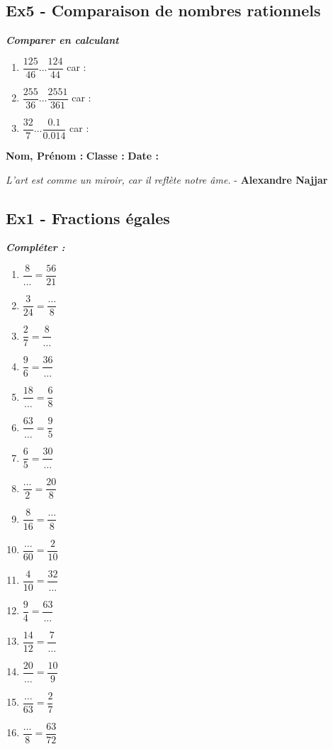 \documentclass[11pt]{article}
\begin{document}
\subsection*{Ex5 - Comparaison de nombres rationnels}

\textit{\textbf{Comparer en calculant}}

\begin{enumerate}
\item $ \dfrac{125}{46} \ldots \dfrac{124}{44} $  car : \dotfill
\item $ \dfrac{255}{36} \ldots \dfrac{2551}{361} $  car : \dotfill
\item $ \dfrac{32}{7} \ldots \dfrac{0.1}{0.014} $  car : \dotfill

\end{enumerate}

\newpage

\textbf{Nom, Prénom :} \hspace{8cm} \textbf{Classe :} \hspace{3cm} \textbf{Date :}\\

\begin{center}
  \textit{L'art est comme un miroir, car il reflète notre âme.}  - \textbf{Alexandre Najjar}
\end{center}


\subsection*{Ex1 - Fractions égales}

\textit{\textbf{Compléter :}}

\begin{multicols}{4}
  \begin{enumerate}
    \item $\dfrac{8}{\ldots}=\dfrac{56}{21}$
    \item $\dfrac{3}{24}=\dfrac{\ldots}{8}$
    \item $\dfrac{2}{7}=\dfrac{8}{\ldots}$
    \item $\dfrac{9}{6}=\dfrac{36}{\ldots}$
    \item $\dfrac{18}{\ldots}=\dfrac{6}{8}$
    \item $\dfrac{63}{\ldots}=\dfrac{9}{5}$
    \item $\dfrac{6}{5}=\dfrac{30}{\ldots}$
    \item $\dfrac{\ldots}{2}=\dfrac{20}{8}$
    \item $\dfrac{8}{16}=\dfrac{\ldots}{8}$
    \item $\dfrac{\ldots}{60}=\dfrac{2}{10}$
    \item $\dfrac{4}{10}=\dfrac{32}{\ldots}$
    \item $\dfrac{9}{4}=\dfrac{63}{\ldots}$
    \item $\dfrac{14}{12}=\dfrac{7}{\ldots}$
    \item $\dfrac{20}{\ldots}=\dfrac{10}{9}$
    \item $\dfrac{\ldots}{63}=\dfrac{2}{7}$
    \item $\dfrac{\ldots}{8}=\dfrac{63}{72}$
  \end{enumerate}
\end{multicols}
\end{document}
